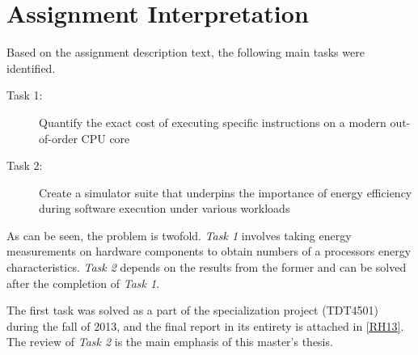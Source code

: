 \section{Assignment Interpretation}

Based on the assignment description text, the following main tasks were
identified.

\begin{description}
    \item[Task 1:] Quantify the exact cost of executing specific instructions on
        a modern out-of-order CPU core
    \item[Task 2:] Create a simulator suite that underpins the importance of
        energy efficiency during software execution under various workloads
\end{description}

As can be seen, the problem is twofold. \textit{Task 1} involves taking energy
measurements on hardware components to obtain numbers of a processors energy
characteristics. \textit{Task 2} depends on the results from the former and can
be solved after the completion of \textit{Task 1}.

The first task was solved as a part of the specialization project (TDT4501)
during the fall of 2013, and the final report in its entirety is attached in
\autoref{RH13}. The review of \textit{Task 2} is the main emphasis of this
master's thesis.
